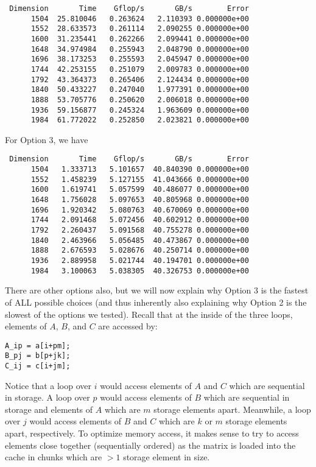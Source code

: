\documentclass[10pt, letterpaper]{article}
\begin{document}
\begin{verbatim}
 Dimension       Time    Gflop/s       GB/s        Error
      1504  25.810046   0.263624   2.110393 0.000000e+00
      1552  28.633573   0.261114   2.090255 0.000000e+00
      1600  31.235441   0.262266   2.099441 0.000000e+00
      1648  34.974984   0.255943   2.048790 0.000000e+00
      1696  38.173253   0.255593   2.045947 0.000000e+00
      1744  42.253155   0.251079   2.009783 0.000000e+00
      1792  43.364373   0.265406   2.124434 0.000000e+00
      1840  50.433227   0.247040   1.977391 0.000000e+00
      1888  53.705776   0.250620   2.006018 0.000000e+00
      1936  59.156877   0.245324   1.963609 0.000000e+00
      1984  61.772022   0.252850   2.023821 0.000000e+00
\end{verbatim}
For Option 3, we have
\begin{verbatim}
 Dimension       Time    Gflop/s       GB/s        Error
      1504   1.333713   5.101657  40.840390 0.000000e+00
      1552   1.458239   5.127155  41.043666 0.000000e+00
      1600   1.619741   5.057599  40.486077 0.000000e+00
      1648   1.756028   5.097653  40.805968 0.000000e+00
      1696   1.920342   5.080763  40.670069 0.000000e+00
      1744   2.091468   5.072456  40.602912 0.000000e+00
      1792   2.260437   5.091568  40.755278 0.000000e+00
      1840   2.463966   5.056485  40.473867 0.000000e+00
      1888   2.676593   5.028676  40.250714 0.000000e+00
      1936   2.889958   5.021744  40.194701 0.000000e+00
      1984   3.100063   5.038305  40.326753 0.000000e+00
\end{verbatim}
There are other options also, but we will now explain why Option 3 is the fastest of ALL possible choices (and thus inherently also explaining why Option 2 is the slowest of the options we tested). Recall that at the inside of the three loops, elements of $A$, $B$, and $C$ are accessed by:
\begin{verbatim}
A_ip = a[i+pm];
B_pj = b[p+jk];
C_ij = c[i+jm];
\end{verbatim}
Notice that a loop over $i$ would access elements of $A$ and $C$ which are sequential in storage. A loop over $p$ would access elements of $B$ which are sequential in storage and elements of $A$ which are $m$ storage elements apart. Meanwhile, a loop over $j$ would access elements of $B$ and $C$ which are $k$ or $m$ storage elements apart, respectively. To optimize memory access, it makes sense to try to access elements close together (sequentially ordered) as the matrix is loaded into the cache in chunks which are $>1$ storage element in size.\\\\
\end{document}
